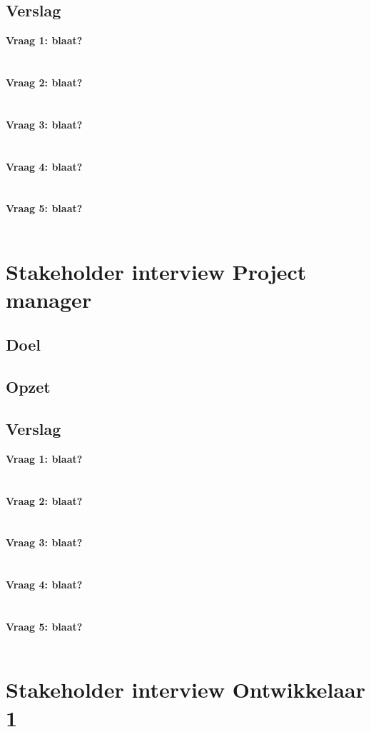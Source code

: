 \subsection{Verslag}
\textbf{Vraag 1: blaat?}\\
\lipsum[01]\\
\\
\textbf{Vraag 2: blaat?}\\
\lipsum[02]\\
\\
\textbf{Vraag 3: blaat?}\\
\lipsum[03]\\
\\
\textbf{Vraag 4: blaat?}\\
\lipsum[04]\\
\\
\textbf{Vraag 5: blaat?}\\
\lipsum[05]\\

\section{Stakeholder interview Project manager}
\subsection{Doel}
\subsection{Opzet}
\subsection{Verslag}
\textbf{Vraag 1: blaat?}\\
\lipsum[01]\\
\\
\textbf{Vraag 2: blaat?}\\
\lipsum[02]\\
\\
\textbf{Vraag 3: blaat?}\\
\lipsum[03]\\
\\
\textbf{Vraag 4: blaat?}\\
\lipsum[04]\\
\\
\textbf{Vraag 5: blaat?}\\
\lipsum[05]\\

\section{Stakeholder interview Ontwikkelaar 1}
